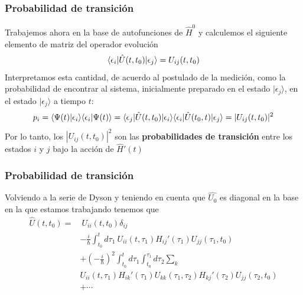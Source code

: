 \documentclass{beamer}
\begin{document}
\begin{frame}
    \frametitle{Probabilidad de transición}
    Trabajemos ahora en la base de autofunciones de $\hat{H}^0$ y calculemos el siguiente elemento de matriz del operador evolución
    $$\langle \epsilon_i |\hat{U}(t,t_0)| \epsilon_j \rangle=U_{ij}(t,t_0)$$
    Interpretamos esta cantidad, de acuerdo al postulado de la medición, como la probabilidad de encontrar al sistema, inicialmente preparado en el estado $|\epsilon_j\rangle$, en el estado $|\epsilon_j\rangle$ a tiempo $t$:
    $$p_i=\langle\Psi(t)|\epsilon_i\rangle\langle\epsilon_i|\Psi(t)\rangle
    =\langle \epsilon_j |\hat{U}(t,t_0)|\epsilon_i\rangle\langle\epsilon_i|\hat{U}(t_0,t)| \epsilon_j \rangle=|U_{ij}(t,t_0)|^2$$
    Por lo tanto, los $|U_{ij}(t,t_0)|^2$ son las {\bf probabilidades de transición} entre los estados $i$ y $j$ bajo la acción de $\hat{H}'(t)$
\end{frame}

\begin{frame}
    \frametitle{Probabilidad de transición}
    Volviendo a la serie de Dyson y teniendo en cuenta que $\hat{U_0}$ es diagonal en la base en la que estamos trabajando tenemos que
    \begin{align*}
        \hat{U}(t,t_0)  = &\ U_{ii}(t,t_0)\delta_{ij} \\
                       & -\frac{i}{\hbar} \int_{t_0}^{t} d\tau_1\ U_{ii}(t,\tau_1) H_{ij}'(\tau_1) U_{jj}(\tau_1,t_0) \\
                       & + \left( -\frac{i}{\hbar} \right)^2 
                       \int_{t_0}^{t} d\tau_1 \int_{t_0}^{\tau_1} d\tau_2 \sum_k \\ 
                       &U_{ii}(t,\tau_1) H_{ik}'(\tau_1) U_{kk}(\tau_1,\tau_2) H_{kj}'(\tau_2) U_{jj}(\tau_2,t_0)\\
                       &+ \cdots
    \end{align*}
\end{frame}
\end{document}
